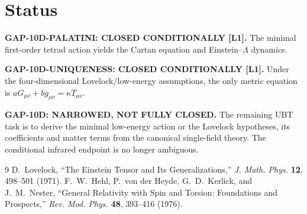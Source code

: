\documentclass[12pt,a4paper]{article}
\theoremstyle{remark}\newtheorem{remark}[definition]{Remark}
\begin{document}
\section{Status}
\begin{tcolorbox}[colback=green!6!white,colframe=green!55!black,title=Defensible status]
\textbf{GAP-10D-PALATINI: CLOSED CONDITIONALLY [L1].}
The minimal first-order tetrad action yields the Cartan equation and
Einstein--$\Lambda$ dynamics.

\medskip
\textbf{GAP-10D-UNIQUENESS: CLOSED CONDITIONALLY [L1].}
Under the four-dimensional Lovelock/low-energy assumptions, the only metric
equation is $aG_{\mu\nu}+bg_{\mu\nu}=\kappa T_{\mu\nu}$.

\medskip
\textbf{GAP-10D: NARROWED, NOT FULLY CLOSED.}
The remaining UBT task is to derive the minimal low-energy action or the
Lovelock hypotheses, its coefficients and matter terms from the canonical
single-field theory.  The conditional infrared endpoint is no longer
ambiguous.
\end{tcolorbox}

\begin{thebibliography}{9}
 D.~Lovelock, ``The Einstein Tensor and Its
Generalizations,'' \emph{J. Math. Phys.} \textbf{12}, 498--501 (1971).
 F.~W.~Hehl, P.~von der Heyde, G.~D.~Kerlick, and J.~M.~Nester,
``General Relativity with Spin and Torsion: Foundations and Prospects,''
\emph{Rev. Mod. Phys.} \textbf{48}, 393--416 (1976).
\end{thebibliography}
\end{document}
